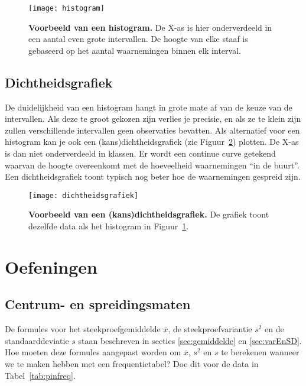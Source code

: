 \begin{figure}
  \centering
  \texttt{[image: histogram]}
  \caption[Voorbeeld van een histogram]{\textbf{Voorbeeld van een histogram.} De X-as is hier onderverdeeld in een aantal even grote intervallen. De hoogte van elke staaf is gebaseerd op het aantal waarnemingen binnen elk interval.}
  \label{fig:histogram}
\end{figure}

\subsection{Dichtheidsgrafiek}

De duidelijkheid van een histogram hangt in grote mate af van de keuze van de intervallen. Als deze te groot gekozen zijn verlies je precisie, en als ze te klein zijn zullen verschillende intervallen geen observaties bevatten. Als alternatief voor een histogram kan je ook een (kans)dichtheidsgrafiek (zie Figuur~\ref{fig:dichtheidsgrafiek}) plotten. De X-as is dan niet onderverdeeld in klassen. Er wordt een continue curve getekend waarvan de hoogte overeenkomt met de hoeveelheid waarnemingen ``in de buurt''. Een dichtheidsgrafiek toont typisch nog beter hoe de waarnemingen gespreid zijn.

\begin{figure}
  \centering
  \texttt{[image: dichtheidsgrafiek]}
  \caption[Voorbeeld van een dichtheidsgrafiek]{\textbf{Voorbeeld van een (kans)dichtheidsgrafiek.} De grafiek toont dezelfde data als het histogram in Figuur~\ref{fig:histogram}.}
  \label{fig:dichtheidsgrafiek}
\end{figure}





\section{Oefeningen}

\subsection{Centrum- en spreidingsmaten}

\begin{exercise}
  \label{ex:mean-stdev-freq}
  De formules voor het steekproefgemiddelde $\overline{x}$, de steekproefvariantie $s^2$ en de standaarddeviatie $s$ staan beschreven in secties \ref{sec:gemiddelde} en \ref{sec:varEnSD}.
  Hoe moeten deze formules aangepast worden om $\overline{x}$, $s^2$ en $s$ te berekenen wanneer we te maken hebben met een frequentietabel? 
  Doe dit voor de data in Tabel~\ref{tab:pinfreq}.
\end{exercise}

